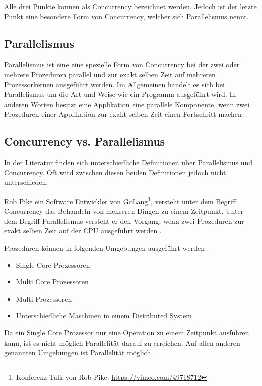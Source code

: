 Alle drei Punkte können als Concurrency bezeichnet werden. Jedoch ist der letzte Punkt eine besondere Form von Concurrency, welcher sich Parallelismus nennt. 

\subsection{Parallelismus}

Parallelismus ist eine eine spezielle Form von Concurrency bei der zwei oder mehrere Prozeduren parallel und  zur exakt selben Zeit auf mehreren Prozessorkernen ausgeführt werden. Im Allgemeinen handelt es sich bei Parallelismus um die Art und Weise wie ein Programm ausgeführt wird. In anderen Worten besitzt eine Applikation eine parallele Komponente, wenn zwei Prozeduren einer Applikation zur exakt selben Zeit einen Fortschritt machen \cite[]{oracle:multithreading}.

\subsection{Concurrency vs. Parallelismus}

In der Literatur finden sich unterschiedliche Definitionen über Parallelismus und Concurrency. Oft wird zwischen diesen beiden Definitionen jedoch nicht unterschieden. 

Rob Pike ein Software Entwickler von GoLang\footnote{Konferenz Talk von Rob Pike: \url{https://vimeo.com/49718712}}, versteht unter dem Begriff Concurrency das Behandeln von mehreren Dingen zu einem Zeitpunkt. Unter dem Begriff Parallelismus versteht er den Vorgang, wenn zwei Prozeduren zur exakt selben Zeit auf der CPU ausgeführt werden \cite[]{Pik2013}.

Prozeduren können in folgenden Umgebungen ausgeführt werden \cite[p. 14]{Erb2012}:

\begin{itemize}
  \item Single Core Prozessoren
  \item Multi Core Prozessoren
  \item Multi Prozessoren
  \item Unterschiedliche Maschinen in einem Distributed System
\end{itemize} 

Da ein Single Core Prozessor nur eine Operation zu einem Zeitpunkt ausführen kann, ist es nicht möglich Parallelität darauf zu erreichen. Auf allen anderen genannten Umgebungen ist Parallelität möglich. 

